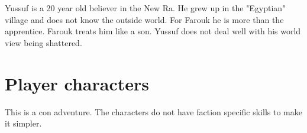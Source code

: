 \begin{npcBox}[title=Yussuf]
    \begin{consequences}
    \item {}
    \item {}
    \item {}
    \end{consequences}

    \begin{npcDescription}
    Yussuf is a 20 year old believer in the New Ra. He grew up in the "Egyptian" village and does not know the outside world. For Farouk he is more than the apprentice. Farouk treats him like a son. Yussuf does not deal well with his world view being shattered.
    \end{npcDescription}

\end{npcBox}


\section{Player characters}

This is a con adventure. The characters do not have faction specific skills to make it simpler.


